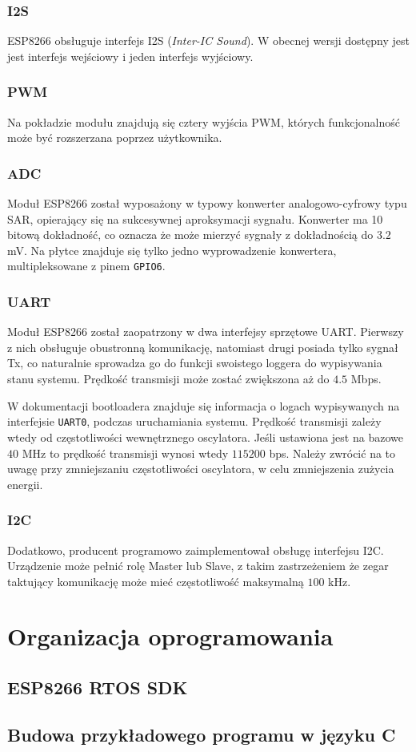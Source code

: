 \subsubsection{I2S}
\label{i2s}
ESP8266 obsługuje interfejs I2S (\textit{Inter-IC Sound}). W obecnej wersji dostępny
jest jest interfejs wejściowy i jeden interfejs wyjściowy.

\subsubsection{PWM}
\label{pwm}
Na pokładzie modułu znajdują się cztery wyjścia PWM, których funkcjonalność może
być rozszerzana poprzez użytkownika.

\subsubsection{ADC}
Moduł ESP8266 został wyposażony w typowy konwerter analogowo-cyfrowy typu SAR, opierający
się na sukcesywnej aproksymacji sygnału. Konwerter ma 10 bitową dokładność, co oznacza
że może mierzyć sygnały z dokładnością do $\num{3.2}$ \si{mV}. Na płytce znajduje się
tylko jedno wyprowadzenie konwertera, multipleksowane z pinem \verb+GPIO6+.

\subsubsection{UART}
Moduł ESP8266 został zaopatrzony w dwa interfejsy sprzętowe UART. Pierwszy z nich
obsługuje obustronną komunikację, natomiast drugi posiada tylko sygnał Tx, co naturalnie
sprowadza go do funkcji swoistego loggera do wypisywania stanu systemu. Prędkość transmisji
może zostać zwiększona aż do $\num{4.5}$ Mbps. 

W dokumentacji bootloadera znajduje się informacja o logach wypisywanych 
na interfejsie \verb+UART0+, podczas uruchamiania systemu. 
Prędkość transmisji zależy wtedy od częstotliwości
wewnętrznego oscylatora. Jeśli ustawiona jest na bazowe $\num{40}$ \si{MHz} to 
prędkość transmisji wynosi wtedy $\num{115200}$ bps. Należy zwrócić na to uwagę
przy zmniejszaniu częstotliwości oscylatora, w celu zmniejszenia zużycia energii.

\subsubsection{I2C}
Dodatkowo, producent programowo zaimplementował obsługę interfejsu I2C. 
Urządzenie może pełnić rolę Master lub Slave, z takim zastrzeżeniem że zegar
taktujący komunikację może mieć częstotliwość maksymalną $\num{100}$ \si{kHz}.\\


\section{Organizacja oprogramowania}
\label{organizacja_opr} 


\subsection{ESP8266 RTOS SDK}
\label{sdk}


\subsection{Budowa przykładowego programu w języku C}
\label{example_C}

